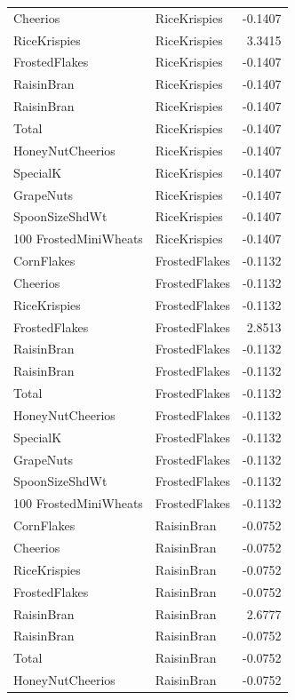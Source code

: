 \begin{longtable}{llr}
Cheerios & RiceKrispies & -0.1407 \\
RiceKrispies & RiceKrispies & 3.3415 \\
FrostedFlakes & RiceKrispies & -0.1407 \\
RaisinBran & RiceKrispies & -0.1407 \\
RaisinBran & RiceKrispies & -0.1407 \\
Total & RiceKrispies & -0.1407 \\
HoneyNutCheerios & RiceKrispies & -0.1407 \\
SpecialK & RiceKrispies & -0.1407 \\
GrapeNuts & RiceKrispies & -0.1407 \\
SpoonSizeShdWt & RiceKrispies & -0.1407 \\
100%
FrostedMiniWheats & RiceKrispies & -0.1407 \\
CornFlakes & FrostedFlakes & -0.1132 \\
Cheerios & FrostedFlakes & -0.1132 \\
RiceKrispies & FrostedFlakes & -0.1132 \\
FrostedFlakes & FrostedFlakes & 2.8513 \\
RaisinBran & FrostedFlakes & -0.1132 \\
RaisinBran & FrostedFlakes & -0.1132 \\
Total & FrostedFlakes & -0.1132 \\
HoneyNutCheerios & FrostedFlakes & -0.1132 \\
SpecialK & FrostedFlakes & -0.1132 \\
GrapeNuts & FrostedFlakes & -0.1132 \\
SpoonSizeShdWt & FrostedFlakes & -0.1132 \\
100%
FrostedMiniWheats & FrostedFlakes & -0.1132 \\
CornFlakes & RaisinBran & -0.0752 \\
Cheerios & RaisinBran & -0.0752 \\
RiceKrispies & RaisinBran & -0.0752 \\
FrostedFlakes & RaisinBran & -0.0752 \\
RaisinBran & RaisinBran & 2.6777 \\
RaisinBran & RaisinBran & -0.0752 \\
Total & RaisinBran & -0.0752 \\
HoneyNutCheerios & RaisinBran & -0.0752 \\

\end{longtable}
